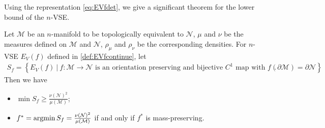 \documentclass{article}
\begin{document}
Using the representation \eqref{eq:EVfdet}, we give a significant theorem for the lower bound of the $n$-VSE.

\begin{theorem} \label{thm:Sfcontinue}
Let $\mathcal{M}$ be an $n$-manifold to be topologically equivalent to $\mathcal{N}$, $\mu$ and $\nu$ be the measures defined on $\mathcal{M}$ and $\mathcal{N}$, $\rho_\mu$ and $\rho_\nu$ be the corresponding densities. For $n$-VSE $E_V(f)$ defined in \eqref{def:EVfcontinue}, let
\begin{align}
    S_f = \left\{E_V(f)~|~f:\mathcal{M}\to \mathcal{N} \text{ is an orientation preserving and bijective $C^1$ map with } f(\partial \mathcal{M}) = \partial \mathcal{N} \right\}. \label{set:Sfcontinue}
\end{align}
Then we have
\begin{itemize}
    \item[(i)] $\min S_f \geq \frac{\nu(\mathcal{N})^2}{\mu(\mathcal{M})}$;
    \item[(ii)] $f^* = \argmin S_f = \frac{\nu(\mathcal{N})^2}{\mu(\mathcal{M})}$ if and only if $f^*$ is mass-preserving.
\end{itemize}
\end{theorem}
\end{document}
